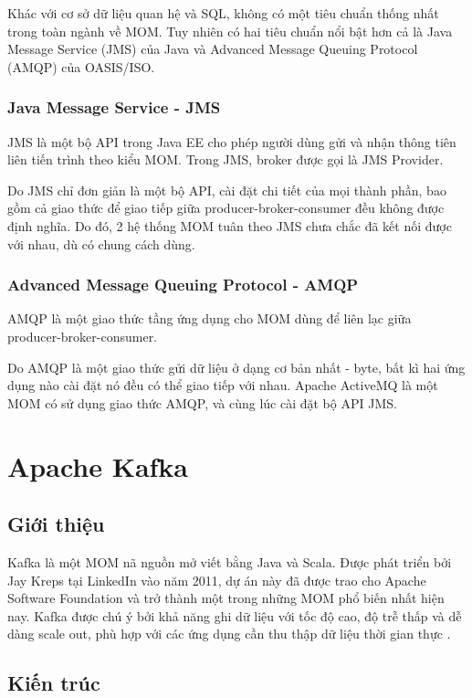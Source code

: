 \documentclass{article}
\begin{document}
Khác với cơ sở dữ liệu quan hệ và SQL, không có một tiêu chuẩn thống nhất trong
toàn ngành về MOM. Tuy nhiên có hai tiêu chuẩn nổi bật hơn cả là Java Message
Service (JMS) của Java và Advanced Message Queuing Protocol (AMQP) của
OASIS/ISO.

\subsubsection{Java Message Service - JMS}

JMS là một bộ API trong Java EE cho phép người dùng gửi và nhận thông tiên liên
tiến trình theo kiểu MOM. Trong JMS, broker được gọi là JMS Provider.

Do JMS chỉ đơn giản là một bộ API, cài đặt chi tiết của mọi thành phần, bao gồm
cả giao thức để giao tiếp giữa producer-broker-consumer đều không được định
nghĩa. Do đó, 2 hệ thống MOM tuân theo JMS chưa chắc đã kết nối được với nhau,
dù có chung cách dùng.

\subsubsection{Advanced Message Queuing Protocol - AMQP}

AMQP là một giao thức tầng ứng dụng cho MOM dùng để liên lạc giữa
producer-broker-consumer.

Do AMQP là một giao thức gửi dữ liệu ở dạng cơ bản nhất - byte, bất kì hai ứng
dụng nào cài đặt nó đều có thể giao tiếp với nhau. Apache ActiveMQ là một MOM có
sử dụng giao thức AMQP, và cùng lúc cài đặt bộ API JMS.

\section{Apache Kafka} \label{kafka}

\subsection{Giới thiệu}

Kafka là một MOM nã nguồn mở viết bằng Java và Scala. Được phát triển bởi Jay
Kreps tại LinkedIn vào năm 2011, dự án này đã được trao cho Apache Software
Foundation và trở thành một trong những MOM phổ biến nhất hiện nay. Kafka được
chú ý bởi khả năng ghi dữ liệu với tốc độ cao, độ trễ thấp và dễ dàng scale out,
phù hợp với các ứng dụng cần thu thập dữ liệu thời gian thực \cite{kafka_intro}.

\subsection{Kiến trúc}
\end{document}

